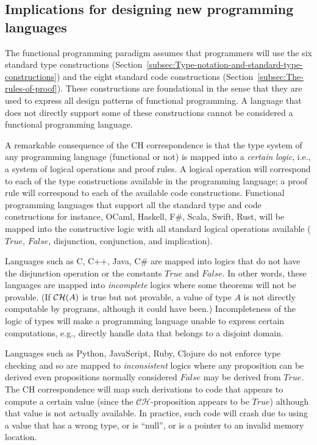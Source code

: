 \subsection{Implications for designing new programming languages}

The functional programming paradigm assumes that programmers will
use the six standard type constructions (Section~\ref{subsec:Type-notation-and-standard-type-constructions})
and the eight standard code constructions (Section~\ref{subsec:The-rules-of-proof}).
These constructions are foundational in the sense that they are used
to express all design patterns of functional programming. A language
that does not directly support some of these constructions cannot
be considered a functional programming language.

A remarkable consequence of the CH correspondence is that the type
system of any programming language (functional or not) is mapped into
a \emph{certain} \emph{logic}, i.e., a system of logical operations
and proof rules. A logical operation will correspond to each of the
type constructions available in the programming language; a proof
rule will correspond to each of the available code constructions.
Functional programming languages that support all the standard type
and code constructions \textemdash{} for instance, OCaml, Haskell,
F\#, Scala, Swift, Rust, \textemdash{} will be mapped into the constructive
logic with all standard logical operations available ($True$, $False$,
disjunction, conjunction, and implication). 

Languages such as C, C++, Java, C\# are mapped into logics that do
not have the disjunction operation or the constants $True$ and $False$.
In other words, these languages are mapped into \emph{incomplete}
logics where some theorems will not be provable. (If ${\cal CH}(A)$
is true but not provable, a value of type $A$ is not directly computable
by programs, although it could have been.) Incompleteness of the logic
of types will make a programming language unable to express certain
computations, e.g., directly handle data that belongs to a disjoint
domain. 

Languages such as Python, JavaScript, Ruby, Clojure do not enforce
type checking and so are mapped to \emph{inconsistent} logics where
any proposition can be derived \textemdash{} even propositions normally
considered $False$ may be derived from $True$. The CH correspondence
will map such derivations to code that appears to compute a certain
value (since the $\mathcal{CH}$-proposition appears to be $True$)
although that value is not actually available. In practice, such code
will crash due to using a value that has a wrong type, or is \textsf{``}null\textsf{''},
or is a pointer to an invalid memory location.

